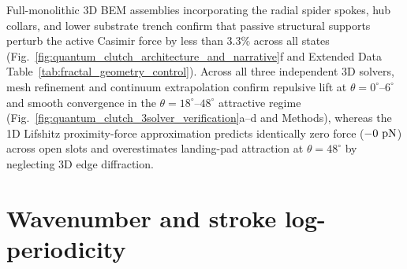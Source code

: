\documentclass[pdflatex,sn-nature]{sn-jnl}
\begin{document}
Full-monolithic 3D BEM assemblies incorporating the radial spider spokes, hub collars, and lower substrate trench confirm that passive structural supports perturb the active Casimir force by less than $3.3\%$ across all states (Fig.~\ref{fig:quantum_clutch_architecture_and_narrative}f and Extended Data Table~\ref{tab:fractal_geometry_control}). Across all three independent 3D solvers, mesh refinement and continuum extrapolation confirm repulsive lift at $\theta = 0^\circ\text{--}6^\circ$ and smooth convergence in the $\theta = 18^\circ\text{--}48^\circ$ attractive regime (Fig.~\ref{fig:quantum_clutch_3solver_verification}a--d and Methods), whereas the 1D Lifshitz proximity-force approximation predicts identically zero force ($-0{}\text{ pN}$) across open slots and overestimates landing-pad attraction at $\theta=48^\circ$ by neglecting 3D edge diffraction.

\section*{Wavenumber and stroke log-periodicity}
\label{sec:log_periodicity_clutch}
\end{document}
